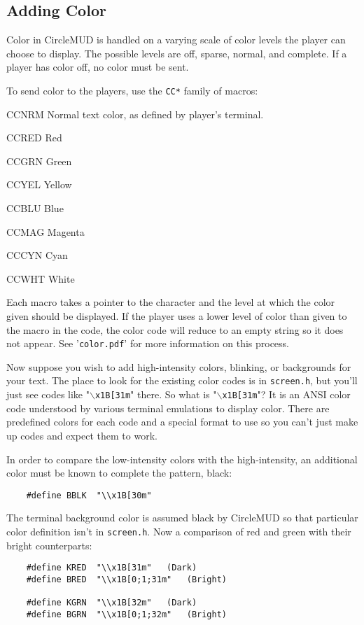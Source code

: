 \documentclass[11pt]{article}
\newenvironment{Ventry}[1]
  {\begin{list}{}{\renewcommand{\makelabel}[1]{\textsf{##1:}\hfil}
    \settowidth{\labelwidth}{\textsf{#1:}}
    \setlength{\leftmargin}{\labelwidth}
    \addtolength{\leftmargin}{\labelsep}
  }
  }
  {\end{list}}
\begin{document}
\subsection{Adding Color}
Color in CircleMUD is handled on a varying scale of color levels the player can choose to display.  The possible levels are off, sparse, normal, and complete.  If a player has color off, no color must be sent.
\par
To send color to the players, use the \texttt{CC*} family of macros:
\begin{Ventry}{CCNRM}
\item[CCNRM] Normal text color, as defined by player's terminal.
\item[CCRED] Red
\item[CCGRN] Green
\item[CCYEL] Yellow
\item[CCBLU] Blue
\item[CCMAG] Magenta
\item[CCCYN] Cyan
\item[CCWHT] White
\end{Ventry}
Each macro takes a pointer to the character and the level at which the color given should be displayed.  If the player uses a lower level of color than given to the macro in the code, the color code will reduce to an empty string so it does not appear. See '\texttt{color.pdf}' for more information on this process.
\par
Now suppose you wish to add high-intensity colors, blinking, or backgrounds for your text.  The place to look for the existing color codes is in \texttt{screen.h}, but you'll just see codes like "\texttt{$\backslash$x1B[31m}" there.  So what is "\texttt{$\backslash$x1B[31m}"? It is an ANSI color code understood by various terminal emulations to display color.  There are predefined colors for each code and a special format to use so you can't just make up codes and expect them to work.
\par
In order to compare the low-intensity colors with the high-intensity, an additional color must be known to complete the pattern, black:
\begin{verbatim}
	#define BBLK  "\\x1B[30m"
\end{verbatim}
The terminal background color is assumed black by CircleMUD so that particular color definition isn't in \texttt{screen.h}. Now a comparison of red and green with their bright counterparts:
\begin{verbatim}
	#define KRED  "\\x1B[31m"	(Dark)
	#define BRED  "\\x1B[0;1;31m"	(Bright)

	#define KGRN  "\\x1B[32m"	(Dark)
	#define BGRN  "\\x1B[0;1;32m"	(Bright)
\end{verbatim}
\end{document}
